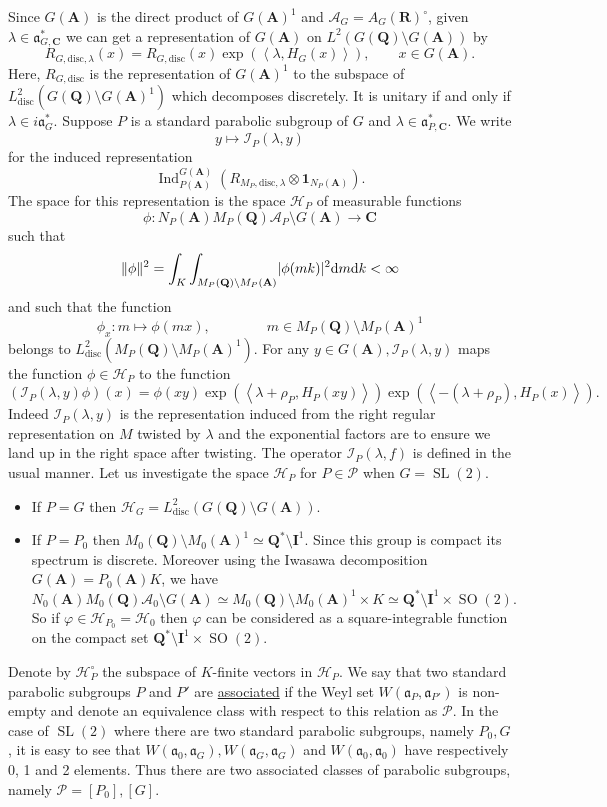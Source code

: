 \documentclass[11pt]{amsart}
\def\A{\mathbf A}
\def\C{\mathbf C}
\def\I{\mathbf I}
\def\Q{\mathbf Q}
\def\R{\mathbf R}
\def\AAA{\mathcal A}	%
\def\HHH{\mathcal H}
\def\III{\mathcal I}
\def\PPP{\mathcal P}
\def\aaa{\mathfrak a}
\def\d{\text d}
\def\bs{\setminus}
\def\disc{\text{disc}}
\def\Ind{\operatorname{Ind}}
\def\Ltwo{L^2}
\def\mod#1{\lvert #1 \rvert} %
\def\norm#1{\Vert #1 \Vert} %
\def\sl{\operatorname{SL}}
\def\sprod#1#2{\left\langle #1 , #2 \right\rangle}  %
\theoremstyle{remark}
\begin{document}
Since $G(\A)$ is the direct product of $G(\A)^1$ and $\AAA_G = A_G(\R)^\circ$, given $\lambda \in \aaa_{G, \C}^*$ we can get a representation of $G(\A)$ on $\Ltwo(G(\Q) \bs G(\A))$ by
\[ R_{G, \disc, \lambda}(x) = R_{G, \disc}(x) \exp(\sprod{\lambda}{H_G(x)}), \qquad x \in G(\A). \]
Here, $R_{G, \disc}$ is the representation of $G(\A)^1$ to the subspace of $\Ltwo_\disc(G(\Q)\bs G(\A)^1)$ which decomposes discretely. It is unitary if and only if $\lambda \in i\aaa_G^*$. Suppose $P$ is a standard parabolic subgroup of $G$ and $\lambda \in \aaa_{P, \C}^*$. We write 
\[ y \mapsto \III_P(\lambda, y) \]
for the induced representation 
\[ \Ind_{P(\A)}^{G(\A)}(R_{M_P, \disc, \lambda} \otimes \mathbf 1_{N_P(\A)}). \]
The space for this representation is the space $\HHH_P$ of measurable functions
\[ \phi : N_P(\A)M_P(\Q)\AAA_P \bs G(\A) \to \C \]
such that 
\[ \norm{\phi}^2 = \int_K \int_{M_P(\Q)\bs M_P(\A)} \mod{\phi(mk)}^2 \d m \d k < \infty \]
and such that the function
\[ \phi_x : m \mapsto \phi(mx), \qquad \qquad m \in M_P(\Q)\bs M_P(\A)^1 \]
belongs to $\Ltwo_\disc(M_P(\Q) \bs M_P(\A)^1)$.
For any $y \in G(\A), \III_P(\lambda, y)$ maps the function $\phi \in \HHH_P$ to the function
\[ (\III_P(\lambda, y)\phi)(x) = \phi(xy) \exp(\sprod{\lambda + \rho_P}{H_P(xy)}) 
		\exp(\sprod{-(\lambda + \rho_P)}{H_P(x)}). \]
Indeed $\III_P(\lambda, y)$ is the representation induced from the right regular representation on $M$ twisted by $\lambda$ and the exponential factors are to ensure we land up in the right space after twisting. The operator $\III_P(\lambda, f)$ is defined in the usual manner. Let us investigate the space $\HHH_P$ for $P \in \PPP$ when $G = \sl(2)$. 
\begin{itemize}
	\item If $P=G$ then $\HHH_G = \Ltwo_{\disc}(G(\Q)\bs G(\A))$. 
	\item If $P = P_0$ then $M_0(\Q)\bs M_0(\A)^1 \simeq \Q^* \bs \I^1$. 
		Since this group is compact its spectrum is discrete. Moreover using the Iwasawa decomposition $G(\A) = P_0(\A) K$, we have
		\[ N_0(\A)M_0(\Q)\AAA_0\bs G(\A) \simeq M_0(\Q)\bs M_0(\A)^1 \times K \simeq \Q^*\bs \I^1 \times \operatorname{SO}(2). \]
		So if $\varphi \in \HHH_{P_0} = \HHH_0$ then $\varphi$ can be considered as a square-integrable function on the compact set $\Q^*\bs \I^1 \times \operatorname{SO}(2)$. 
\end{itemize}

Denote by $\HHH_P^\circ$ the subspace of $K$-finite vectors in $\HHH_P$. We say that two standard parabolic subgroups $P$ and $P'$ are \underline{associated} if the Weyl set $W(\aaa_P, \aaa_{P'})$ is non-empty and denote an equivalence class with respect to this relation as $\PPP$. In the case of $\sl(2)$ where there are two standard parabolic subgroups, namely $P_0, G$, it is easy to see that $W(\aaa_0, \aaa_G), W(\aaa_G, \aaa_G)$ and $W(\aaa_0, \aaa_0)$ have respectively 0, 1 and 2 elements. Thus there are two associated classes of parabolic subgroups, namely $\PPP = [P_0], [G]$. 
\end{document}
